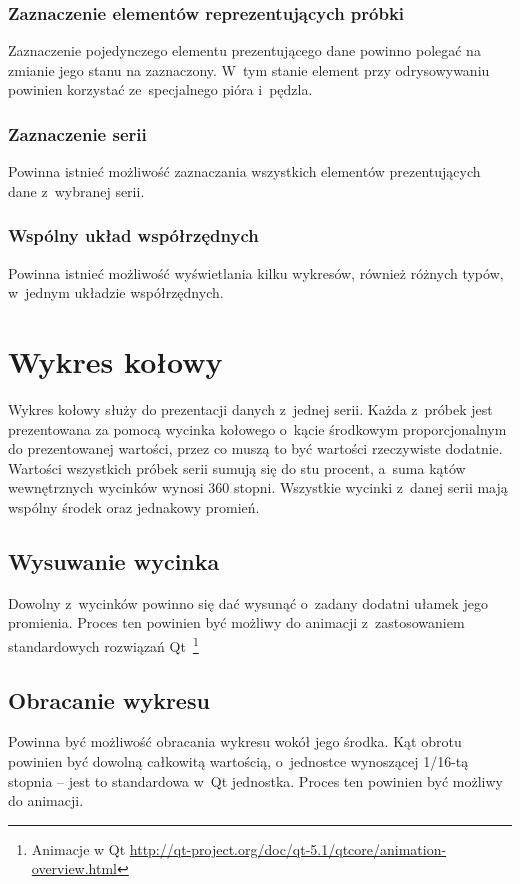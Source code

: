 \subsubsection{Zaznaczenie elementów reprezentujących próbki}
Zaznaczenie pojedynczego elementu prezentującego dane powinno polegać na zmianie jego stanu na zaznaczony. W~tym stanie element przy odrysowywaniu powinien korzystać ze~specjalnego pióra i~pędzla.

\subsubsection{Zaznaczenie serii}
Powinna istnieć możliwość zaznaczania wszystkich elementów prezentujących dane z~wybranej serii.

\subsubsection{Wspólny układ współrzędnych}
Powinna istnieć możliwość wyświetlania kilku wykresów, również różnych typów, w~jednym układzie współrzędnych.

\section{Wykres kołowy}
Wykres kołowy służy do prezentacji danych z~jednej serii. Każda z~próbek jest prezentowana za pomocą wycinka kołowego o~kącie środkowym proporcjonalnym do prezentowanej wartości, przez co muszą to być wartości rzeczywiste dodatnie. Wartości wszystkich próbek serii sumują się do stu procent, a~suma kątów wewnętrznych wycinków wynosi 360 stopni. Wszystkie wycinki z~danej serii mają wspólny środek oraz jednakowy promień.

\subsection{Wysuwanie wycinka}
Dowolny z~wycinków powinno się dać wysunąć o~zadany dodatni ułamek jego promienia. Proces ten powinien być możliwy do animacji z~zastosowaniem standardowych rozwiązań Qt~\footnote{Animacje w Qt \url{http://qt-project.org/doc/qt-5.1/qtcore/animation-overview.html}}

\subsection{Obracanie wykresu}
Powinna być możliwość obracania wykresu wokół jego środka. Kąt obrotu powinien być dowolną całkowitą wartością, o~jednostce wynoszącej 1/16-tą stopnia -- jest to standardowa w~Qt jednostka. Proces ten powinien być możliwy do animacji.
 

